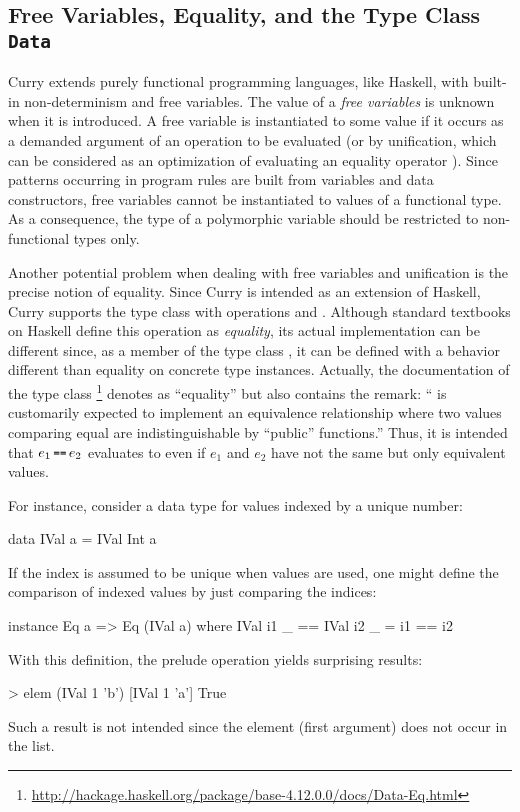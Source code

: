 \subsection{Free Variables, Equality, and the Type Class \texttt{Data}}

Curry extends purely functional programming languages, like Haskell,
with built-in non-determinism and free variables.
The value of a \emph{free variables}
is unknown when it is introduced.
A free variable is instantiated to some value if it occurs
as a demanded argument of an operation to be evaluated
(or by unification, which can be considered
as an optimization of evaluating an equality operator \cite{AntoyHanus17FAoC}).
Since patterns occurring in program rules are built from
variables and data constructors, free variables cannot be
instantiated to values of a functional type.
As a consequence, the type of a polymorphic variable
should be restricted to non-functional types only.

Another potential problem when dealing with free variables
and unification is the precise notion of equality.
Since Curry is intended as an extension of Haskell,
Curry supports the type class  with operations
\ccode{==} and \ccode{/=}.
Although standard textbooks on Haskell define this operation
as \emph{equality},
its actual implementation can be different since, as a member of the
type class , it can be defined with a behavior
different than equality on concrete type instances.
Actually, the documentation of the type class \footnote{%
\url{http://hackage.haskell.org/package/base-4.12.0.0/docs/Data-Eq.html}}
denotes \ccode{==} as ``equality'' but also contains the remark:
``\code{==} is customarily expected to implement an equivalence
relationship where two values comparing equal are indistinguishable
by ``public'' functions.''
Thus, it is intended that $e_1 \seq e_2$ evaluates to 
even if $e_1$ and $e_2$ have not the same but only equivalent values.

For instance, consider a data type for values indexed by a unique
number:
%
\begin{curry}
data IVal a = IVal Int a
\end{curry}
%
If the index is assumed to be unique when  values are used,
one might define the comparison
of indexed values by just comparing the indices:
%
\begin{curry}
instance Eq a => Eq (IVal a) where
  IVal i1 _ == IVal i2 _  =  i1 == i2
\end{curry}
%
With this definition, the prelude operation 
yields surprising results:
%
\begin{curry}
> elem (IVal 1 'b') [IVal 1 'a']
True
\end{curry}
%
Such a result is not intended since the element (first argument)
does not occur in the list.

